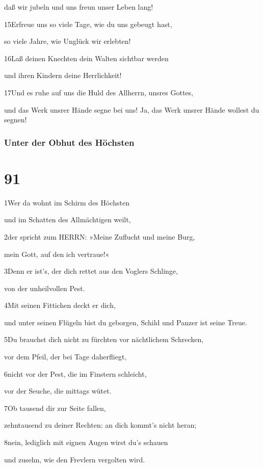 daß wir jubeln und uns freun unser Leben lang!

15Erfreue uns so viele Tage, wie du uns gebeugt hast,

so viele Jahre, wie Unglück wir erlebten!

16Laß deinen Knechten dein Walten sichtbar werden

und ihren Kindern deine Herrlichkeit!

17Und es ruhe auf uns die Huld des Allherrn, unsres Gottes,

und das Werk unsrer Hände segne bei uns! Ja, das Werk unsrer Hände
wollest du segnen!

\hypertarget{unter-der-obhut-des-huxf6chsten}{%
\subsubsection{Unter der Obhut des
Höchsten}\label{unter-der-obhut-des-huxf6chsten}}

\hypertarget{section-90}{%
\section{91}\label{section-90}}

1Wer da wohnt im Schirm des Höchsten

und im Schatten des Allmächtigen weilt,

2der spricht zum HERRN: »Meine Zuflucht und meine Burg,

mein Gott, auf den ich vertraue!«

3Denn er ist's, der dich rettet aus den Voglers Schlinge,

von der unheilvollen Pest.

4Mit seinen Fittichen deckt er dich,

und unter seinen Flügeln bist du geborgen, Schild und Panzer ist seine
Treue.

5Du brauchst dich nicht zu fürchten vor nächtlichem Schrecken,

vor dem Pfeil, der bei Tage daherfliegt,

6nicht vor der Pest, die im Finstern schleicht,

vor der Seuche, die mittags wütet.

7Ob tausend dir zur Seite fallen,

zehntausend zu deiner Rechten: an dich kommt's nicht heran;

8nein, lediglich mit eignen Augen wirst du's schauen

und zusehn, wie den Frevlern vergolten wird.

